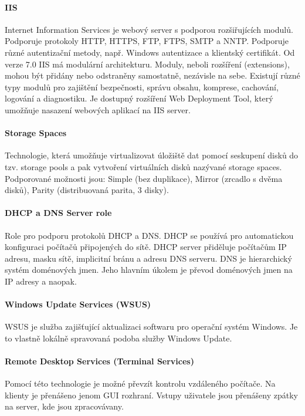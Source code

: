 \paragraph{IIS} 
Internet Information Services je webový server s podporou rozšiřujících modulů. Podporuje protokoly HTTP, HTTPS, FTP, FTPS, SMTP a NNTP. Podporuje různé autentizační metody, např. Windows autentizace a klientský certifikát. Od verze 7.0 IIS má modulární architekturu.  Moduly, neboli rozšíření (extensions), mohou být přidány nebo odstraněny samostatně, nezávisle na sebe.
Existují různé typy modulů pro zajištění bezpečnosti, správu obsahu, komprese, cachování, logování a diagnostiku. Je dostupný rozšíření Web Deployment Tool, který umožňuje nasazení webových aplikací na IIS server. \cite{MasteringWindowsServer}

\paragraph{Storage Spaces} 
Technologie, která umožňuje virtualizovat úložiště dat pomocí seskupení disků do tzv. storage pools a pak vytvoření virtuálních disků nazývané storage spaces. Podporované možnosti jsou: Simple (bez duplikace), Mirror (zrcadlo s dvěma disků), Parity (distribuovaná parita, 3 disky). \cite{MasteringWindowsServer}

\paragraph{DHCP a DNS Server role} 
Role pro podporu protokolů DHCP a DNS. DHCP se používá pro automatickou konfiguraci počítačů připojených do sítě. DHCP server přiděluje počítačům IP adresu, masku sítě, implicitní bránu a adresu DNS serveru. DNS je hierarchický systém doménových jmen. Jeho hlavním úkolem je převod doménových jmen na IP adresy a naopak. \cite{MasteringWindowsServer}

\paragraph{Windows Update Services (WSUS)} 
WSUS je služba zajišťující aktualizaci softwaru pro operační systém Windows. Je to vlastně lokálně spravovaná podoba služby Windows Update. \cite{MasteringWindowsServer}

\paragraph{Remote Desktop Services (Terminal Services)} 
Pomocí této technologie je možné převzít kontrolu vzdáleného počítače. Na klienty je přenášeno jenom GUI rozhraní. Vstupy uživatele jsou přenášeny zpátky na server, kde jsou zpracovávany. \cite{MasteringWindowsServer}

